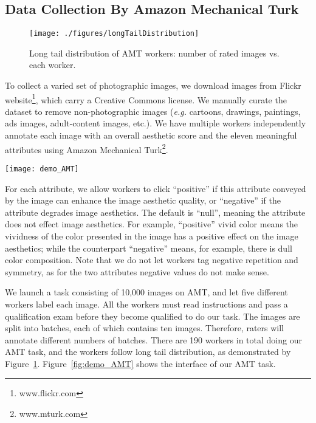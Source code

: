 \documentclass[runningheads]{llncs}
\def\eg{\emph{e.g. }}
\begin{document}
\subsection*{Data Collection By Amazon Mechanical Turk}
\begin{figure}
\begin{center}
\texttt{[image: ./figures/longTailDistribution]}
\end{center}
   \caption{Long tail distribution of AMT workers: number of rated images vs. each worker.}
\label{fig:longTailDis}
\end{figure}

To collect a varied set of photographic images, we download images
from Flickr website\footnote{www.flickr.com},
which carry a Creative Commons
license.
We manually curate the dataset to remove non-photographic images
(\eg cartoons, drawings, paintings, ads images, adult-content images, etc.).
We have multiple workers independently annotate each image with an overall
aesthetic score and the eleven meaningful attributes using Amazon
Mechanical Turk\footnote{www.mturk.com}.


\begin{figure*}[!ht]
\begin{center}
\texttt{[image: demo\_AMT]}
\end{center}
   \caption{Interface of data collection by AMT.}
\label{fig:demo_AMT}
\end{figure*}

For each attribute,
we allow workers to click ``positive'' if this attribute conveyed by the image can enhance the image aesthetic quality, or ``negative'' if the attribute degrades image aesthetics.
The default is ``null'', meaning the attribute does not effect image aesthetics.
For example,
``positive'' vivid color means the vividness of the color presented in the image has a positive effect on the image aesthetics;
while the counterpart ``negative'' means, for example, there is dull color composition.
Note that we do not let workers tag negative repetition and symmetry,
as for the two attributes negative values do not make sense.


We launch a task consisting of 10,000 images on AMT, and let five different workers label each image.
All the workers must read instructions and pass a qualification exam before they become qualified to do our task.
The images are split into batches,
each of which contains ten images.
Therefore,
raters will annotate different numbers of batches.
There are 190 workers in total doing our AMT task,
and the workers follow long tail distribution,
as demonstrated by Figure~\ref{fig:longTailDis}.
Figure~\ref{fig:demo_AMT} shows the interface of our AMT task.
\end{document}
